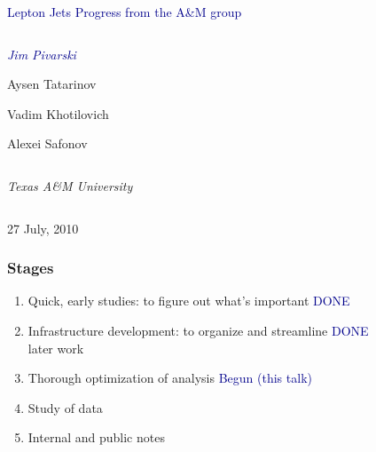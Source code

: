 \documentclass[compress]{beamer}
\begin{document}
\begin{frame}
\vfill
\begin{center}
\textcolor{darkblue}{\Large Lepton Jets Progress from the A\&M group}

\vfill
\begin{columns}
\begin{center}
\large
\textcolor{darkblue}{\it Jim Pivarski}

Aysen Tatarinov

Vadim Khotilovich

Alexei Safonov
\end{center}
\end{columns}

\begin{columns}
\begin{center}
\scriptsize
{\it Texas A\&M University}
\end{center}
\end{columns}

\vfill
27 July, 2010

\end{center}
\end{frame}


\small

\begin{frame}
\frametitle{Stages}
\begin{enumerate}\setlength{\itemsep}{0.25 cm}
\item Quick, early studies: to figure out what's important \hfill \textcolor{darkblue}{DONE}
\item Infrastructure development: to organize and streamline \hfill \textcolor{darkblue}{DONE} \\ later work
\item Thorough optimization of analysis \hfill \textcolor{darkblue}{Begun (this talk)}
\item Study of data
\item Internal and public notes
\end{enumerate}
\end{frame}
\end{document}
